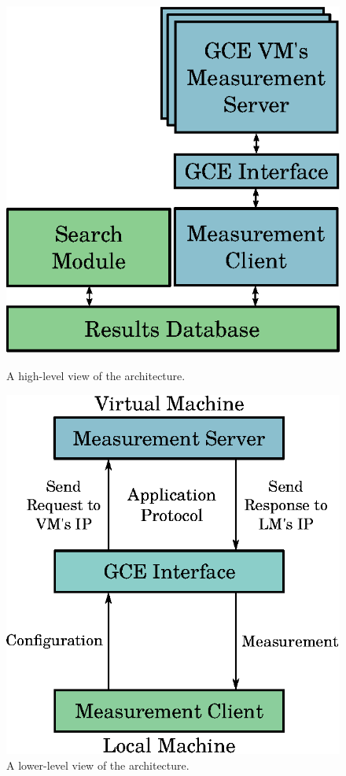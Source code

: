 \documentclass[a4paper, 12pt]{article}
\begin{document}
\begin{figure}[htpb]
    \centering
    \begin{minipage}{.45\textwidth}
        \centering
        \includegraphics[scale=.64]{high-level-implementation}
        \caption{A high-level view of the architecture.}
        \label{fig:high-level}
    \end{minipage}%
    \hfill
    \begin{minipage}{.45\textwidth}
        \centering
        \includegraphics[scale=.64]{low-level-implementation}
        \caption{A lower-level view of the architecture.}
        \label{fig:low-level}
    \end{minipage}%
    \label{fig:archs}
\end{figure}
\end{document}
